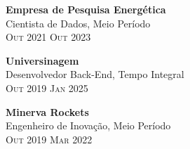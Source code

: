 \documentclass[oneside]{article}
\begin{document}
{\begin{minipage}[t][\dimexpr\textheight-2\fboxrule-2\fboxsep\relax][t]{\dimexpr0.6\textwidth-2\fboxrule-2\fboxsep\relax}
        {\large \textbf{Empresa de Pesquisa Energética}} \\
        {{\selectfont Cientista de Dados, Meio Período}} \\
        {\scshape{}\selectfont\footnotesize Out 2021 \textendash{} Out 2023} 
        \vspace{.3cm}

        {\large \textbf{Universinagem}}\\
        {{\selectfont Desenvolvedor Back-End, Tempo Integral}}\\
        {\scshape{}\selectfont\footnotesize Out 2019 \textendash{} Jan 2025} 
        \vspace{.3cm}

        {\large \textbf{Minerva Rockets}}\\
        {{\selectfont Engenheiro de Inovação, Meio Período}}\\
        {\scshape{}\selectfont\footnotesize Out 2019 \textendash{} Mar 2022} 
        \vspace{.3cm}

\end{minipage}}
\end{document}
